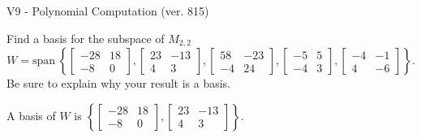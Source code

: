 \begin{exercise}
  \begin{exerciseTitle}V9 - Polynomial Computation (ver. 815)\end{exerciseTitle}
  \begin{exerciseStatement}
    Find a basis for the subspace of \(M_{2,2}\) 
\[W=\mathrm{span}\ \left\{\left[\begin{array}{cc}
-28 & 18 \\
-8 & 0
\end{array}\right] , \left[\begin{array}{cc}
23 & -13 \\
4 & 3
\end{array}\right] , \left[\begin{array}{cc}
58 & -23 \\
-4 & 24
\end{array}\right] , \left[\begin{array}{cc}
-5 & 5 \\
-4 & 3
\end{array}\right] , \left[\begin{array}{cc}
-4 & -1 \\
4 & -6
\end{array}\right]\right\}.\]
 Be sure to explain why your result is a basis.


  \end{exerciseStatement}
  \begin{exerciseAnswer}
   A basis of \(W\) is  \(\left\{\left[\begin{array}{cc}
-28 & 18 \\
-8 & 0
\end{array}\right] , \left[\begin{array}{cc}
23 & -13 \\
4 & 3
\end{array}\right]\right\}\).
  


  \end{exerciseAnswer}
\end{exercise}